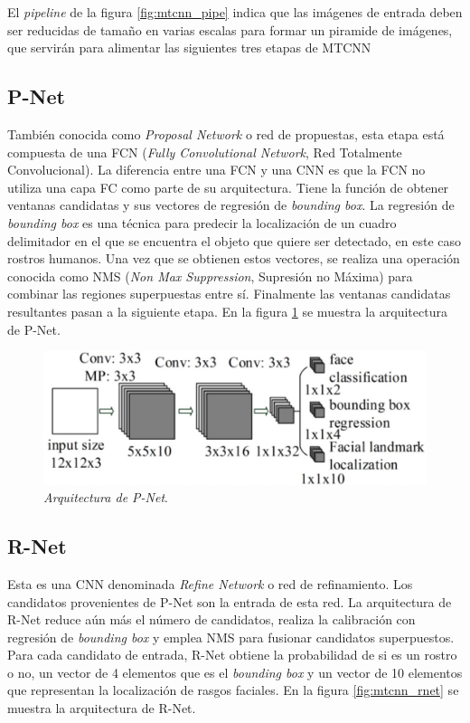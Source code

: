 El \textit{pipeline} de la figura \ref{fig:mtcnn_pipe} indica que las imágenes de entrada deben ser reducidas de tamaño en varias escalas para formar un piramide de imágenes, que servirán para alimentar las siguientes tres etapas de MTCNN

\subsection{P-Net}
También conocida como \textit{Proposal Network} o red de propuestas, esta etapa está compuesta de una FCN (\textit{Fully Convolutional Network}, Red Totalmente Convolucional). La diferencia entre una FCN y una CNN es que la FCN no utiliza una capa FC como parte de su arquitectura. Tiene la función de obtener ventanas candidatas y sus vectores de regresión de \textit{bounding box}. La regresión de \textit{bounding box} es una técnica para predecir la localización de un cuadro delimitador en el que se encuentra el objeto que quiere ser detectado, en este caso rostros humanos. Una vez que se obtienen estos vectores, se realiza una operación conocida como NMS (\textit{Non Max Suppression}, Supresión no Máxima) para combinar las regiones superpuestas entre sí. Finalmente las ventanas candidatas resultantes pasan a la siguiente etapa. En la figura \ref{fig:mtcnn_pnet} se muestra la arquitectura de P-Net.

\begin{figure}[h]
	\centering
	\includegraphics[scale=0.25]{./Figures/mtcnn_pnet.png}
	\caption{\textit{Arquitectura de P-Net}.}
	\label{fig:mtcnn_pnet}
\end{figure}
	
\subsection{R-Net}
Esta es una CNN denominada \textit{Refine Network} o red de refinamiento. Los candidatos provenientes de P-Net son la entrada de esta red. La arquitectura de R-Net reduce aún más el número de candidatos, realiza la calibración con regresión de \textit{bounding box} y emplea NMS para fusionar candidatos superpuestos. Para cada candidato de entrada, R-Net obtiene la probabilidad de si es un rostro o no, un vector de 4 elementos que es el \textit{bounding box} y un vector de 10 elementos que representan la localización de rasgos faciales. En la figura \ref{fig:mtcnn_rnet} se muestra la arquitectura de R-Net.

